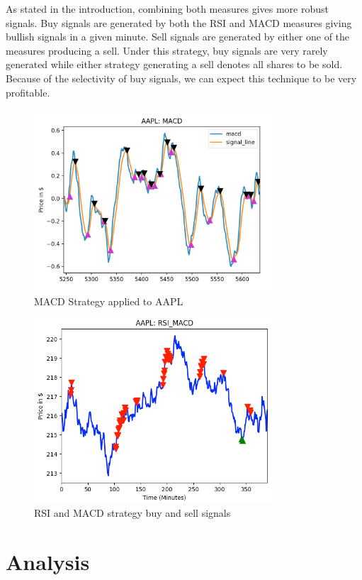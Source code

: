\documentclass[letterpaper,11pt]{article}
\begin{document}
As stated in the introduction, combining both measures gives more robust signals. Buy signals are generated by both the RSI and MACD measures giving bullish signals in a given minute. Sell signals are generated by either one of the measures producing a sell. Under this strategy, buy signals are very rarely generated while either strategy generating a sell denotes all shares to be sold. Because of the selectivity of buy signals, we can expect this technique to be very profitable. 


\begin{figure}[ht!]
\centering
\includegraphics[width=90mm]{AAPL_MACD.png}
\caption{MACD Strategy applied to AAPL \label{overflow}}
\end{figure}

\begin{figure}[ht!]
\centering
\includegraphics[width=90mm]{AAPL_RSIxMACD.png}
\caption{RSI and MACD strategy buy and sell signals \label{overflow}}
\end{figure}

\section*{Analysis}
\end{document}
